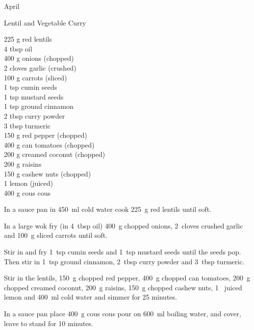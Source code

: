\begin{menu}{April}
    \begin{recipe}{2}{Lentil and Vegetable Curry}%
		\begin{ingredients}
		225 g red lentils  \\
	4 tbsp oil  \\
	400 g onions (chopped) \\
	2 cloves garlic (crushed) \\
	100 g carrots (sliced) \\
	1 tsp cumin seeds  \\
	1 tsp mustard seeds  \\
	1 tsp ground cinnamon  \\
	2 tbsp curry powder  \\
	3 tbsp turmeric  \\
	150 g red pepper (chopped) \\
	400 g can tomatoes (chopped) \\
	200 g creamed coconut (chopped) \\
	200 g raisins  \\
	150 g cashew nuts (chopped) \\
	1  lemon (juiced) \\
	400 g cous cous  \\
	
		\end{ingredients}
	
	
	
    \begin{instructions}
    \item 
        In a sauce pan in
        450~ml  cold water
        cook
        225~g  red lentils
        until soft.
      \item 
        In a large wok fry
        (in 4~tbsp  oil)
        400~g chopped onions,
        2~cloves crushed garlic
        and
        100~g sliced carrots
        until soft.
      \item 
        Stir in and fry
        1~tsp  cumin seeds
        and
        1~tsp  mustard seeds
        until the seeds pop.
        Then stir in
        1~tsp  ground cinnamon,
        2~tbsp  curry powder
        and
        3~tbsp  turmeric.
      \item 
        Stir in
        the lentils,
        150~g chopped red pepper,
        400~g chopped can tomatoes,
        200~g chopped creamed coconut,
        200~g  raisins,
        150~g chopped cashew nuts,
        1~ juiced lemon
        and
        400~ml  cold water
        and simmer for 25 minutes.
      \item 
    In a
    sauce pan 
    place
    400~g  cous cous
    pour on
    600~ml  boiling water,
    and cover, leave to stand for 10 minutes.
  

\end{instructions}
\end{recipe}
\end{menu}
